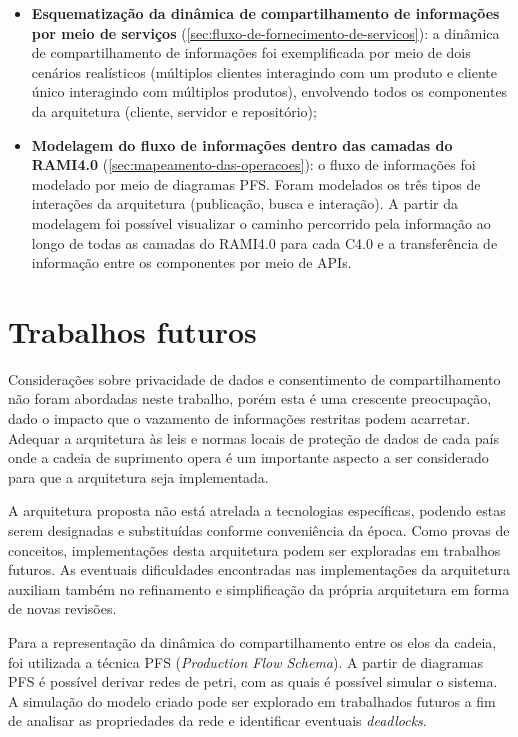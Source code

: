 \begin{itemize}
  \item \textbf{Esquematização da dinâmica de compartilhamento de informações por meio de serviços} (\autoref{sec:fluxo-de-fornecimento-de-servicos}): a dinâmica de compartilhamento de informações foi exemplificada por meio de dois cenários realísticos (múltiplos clientes interagindo com um produto e cliente único interagindo com múltiplos produtos), envolvendo todos os componentes da arquitetura (cliente, servidor e repositório);
  \item \textbf{Modelagem do fluxo de informações dentro das camadas do RAMI4.0} (\autoref{sec:mapeamento-das-operacoes}): o fluxo de informações foi modelado por meio de diagramas PFS. Foram modelados os três tipos de interações da arquitetura (publicação, busca e interação). A partir da modelagem foi possível visualizar o caminho percorrido pela informação ao longo de todas as camadas do RAMI4.0 para cada C4.0 e a transferência de informação entre os componentes por meio de APIs.
\end{itemize}

\section{Trabalhos futuros}

Considerações sobre privacidade de dados e consentimento de compartilhamento não foram abordadas neste trabalho, porém esta é uma crescente preocupação, dado o impacto que o vazamento de informações restritas podem acarretar. Adequar a arquitetura às leis e normas locais de proteção de dados de cada país onde a cadeia de suprimento opera é um importante aspecto a ser considerado para que a arquitetura seja implementada.

A arquitetura proposta não está atrelada a tecnologias específicas, podendo estas serem designadas e substituídas conforme conveniência da época. Como provas de conceitos, implementações desta arquitetura podem ser exploradas em trabalhos futuros. As eventuais dificuldades encontradas nas implementações da arquitetura auxiliam também no refinamento e simplificação da própria arquitetura em forma de novas revisões.

Para a representação da dinâmica do compartilhamento entre os elos da cadeia, foi utilizada a técnica PFS (\textit{Production Flow Schema}). A partir de diagramas PFS é possível derivar redes de petri, com as quais é possível simular o sistema. A simulação do modelo criado pode ser explorado em trabalhados futuros a fim de analisar as propriedades da rede e identificar eventuais \textit{deadlocks}.
